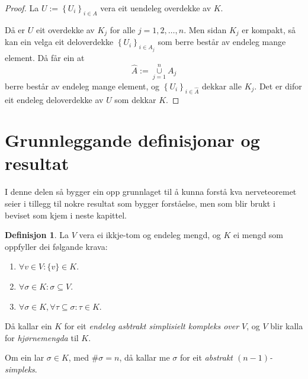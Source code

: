 \documentclass[a4paper, 12pt, norsk]{article}
\theoremstyle{plain}
\theoremstyle{definition}
\newtheorem{definition}[theorem]{Definisjon}
\newcommand{\union}{ \mathop{\cup}\limits }
\newcommand{\set}[1]{ \left\{ #1 \right\} } %
\begin{document}
\begin{proof}
	La \( U := \set{U_i}_{i \in A} \) vera eit uendeleg overdekke av \( K \).

	Då er \( U \) eit overdekke av \( K_j \) for alle \( j = 1, 2, \dots, n \). Men sidan \( K_j \) er kompakt, så kan ein velga eit deloverdekke \( \set{U_i}_{i \in A_j} \) som berre består av endeleg mange element. Då får ein at
	\[
		\hat{A} := \union_{j = 1}^n A_j
	\]
	berre består av endeleg mange element, og \( \set{U_i}_{i \in \hat{A}} \) dekkar alle \( K_j \). Det er difor eit endeleg deloverdekke av \( U \) som dekkar \( K \).
\end{proof}

\section{Grunnleggande definisjonar og resultat}

I denne delen så bygger ein opp grunnlaget til å kunna forstå kva nerveteoremet seier i tillegg til nokre resultat som bygger forståelse, men som blir brukt i beviset som kjem i neste kapittel.

\begin{definition} \label{def:ASK}
	La $V$ vera ei ikkje-tom og endeleg mengd, og \( K \) ei mengd som oppfyller dei følgande krava: 
	\begin{enumerate}
		\item{$\forall v \in V: \{v\} \in K$.}
		\item{\( \forall \sigma \in K: \sigma \subseteq V \).}
		\item{$\forall \sigma \in K, \forall \tau \subseteq \sigma: \tau \in K$.}
	\end{enumerate}

	Då kallar ein $K$ for eit \emph{endeleg asbtrakt simplisielt kompleks over $V$}, og $V$ blir kalla for \emph{hjørnemengda} til $K$.

	Om ein lar \( \sigma \in K \), med \( \#\sigma = n \), då kallar me \( \sigma \) for eit \emph{abstrakt \( (n-1) \)-simpleks}.
\end{definition}
\end{document}
